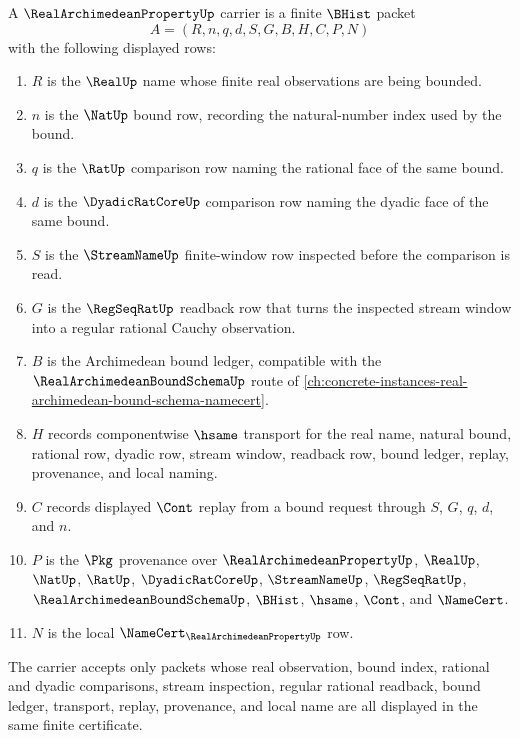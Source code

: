 \begin{definition}
\label{def:real-archimedean-property-carrier}
A $\RealArchimedeanPropertyUp$ carrier is a finite $\BHist$ packet
$$
A=(R,n,q,d,S,G,B,H,C,P,N)
$$
with the following displayed rows:
\begin{enumerate}
\item $R$ is the $\RealUp$ name whose finite real observations are being bounded.
\item $n$ is the $\NatUp$ bound row, recording the natural-number index used by the bound.
\item $q$ is the $\RatUp$ comparison row naming the rational face of the same bound.
\item $d$ is the $\DyadicRatCoreUp$ comparison row naming the dyadic face of the same bound.
\item $S$ is the $\StreamNameUp$ finite-window row inspected before the comparison is read.
\item $G$ is the $\RegSeqRatUp$ readback row that turns the inspected stream window into a regular rational Cauchy observation.
\item $B$ is the Archimedean bound ledger, compatible with the $\RealArchimedeanBoundSchemaUp$ route of \autoref{ch:concrete-instances-real-archimedean-bound-schema-namecert}.
\item $H$ records componentwise $\hsame$ transport for the real name, natural bound, rational row, dyadic row, stream window, readback row, bound ledger, replay, provenance, and local naming.
\item $C$ records displayed $\Cont$ replay from a bound request through $S$, $G$, $q$, $d$, and $n$.
\item $P$ is the $\Pkg$ provenance over $\RealArchimedeanPropertyUp$, $\RealUp$, $\NatUp$, $\RatUp$, $\DyadicRatCoreUp$, $\StreamNameUp$, $\RegSeqRatUp$, $\RealArchimedeanBoundSchemaUp$, $\BHist$, $\hsame$, $\Cont$, and $\NameCert$.
\item $N$ is the local $\NameCert_{\RealArchimedeanPropertyUp}$ row.
\end{enumerate}
The carrier accepts only packets whose real observation, bound index, rational and dyadic comparisons, stream inspection, regular rational readback, bound ledger, transport, replay, provenance, and local name are all displayed in the same finite certificate.
\end{definition}

